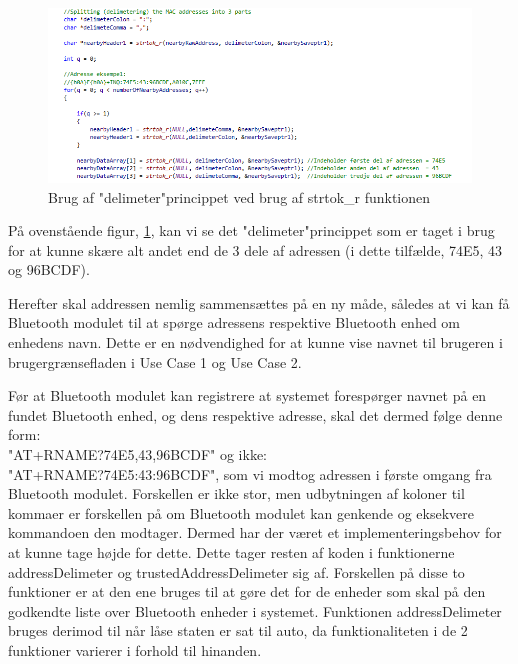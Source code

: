 \begin{figure}[H]
	\centering
	\includegraphics[width = 500 pt]{Img/delimetering.PNG}
	\caption{Brug af "delimeter"\-princippet ved brug af strtok\_r funktionen}
	\label{fig:delimeter}
\end{figure}

På ovenstående figur, \ref{fig:delimeter}, kan vi se det "delimeter"\-princippet som er taget i brug for at kunne skære alt andet end de 3 dele af adressen (i dette tilfælde, 74E5, 43 og 96BCDF).

Herefter skal addressen nemlig sammensættes på en ny måde, således at vi kan få Bluetooth modulet til at spørge adressens respektive Bluetooth enhed om enhedens navn. Dette er en nødvendighed for at kunne vise navnet til brugeren i brugergrænsefladen i Use Case 1 og Use Case 2.

Før at Bluetooth modulet kan registrere at systemet forespørger navnet på en fundet Bluetooth enhed, og dens respektive adresse, skal det dermed følge denne form:\\ "AT+RNAME?74E5,43,96BCDF" og ikke:\\ "AT+RNAME?74E5:43:96BCDF", som vi modtog adressen i første omgang fra Bluetooth modulet. Forskellen er ikke stor, men udbytningen af koloner til kommaer er forskellen på om Bluetooth modulet kan genkende og eksekvere kommandoen den modtager. Dermed har der været et implementeringsbehov for at kunne tage højde for dette. Dette tager resten af koden i funktionerne addressDelimeter og trustedAddressDelimeter sig af. Forskellen på disse to funktioner er at den ene bruges til at gøre det for de enheder som skal på den godkendte liste over Bluetooth enheder i systemet. Funktionen addressDelimeter bruges derimod til når låse staten er sat til auto, da funktionaliteten i de 2 funktioner varierer i forhold til hinanden.

